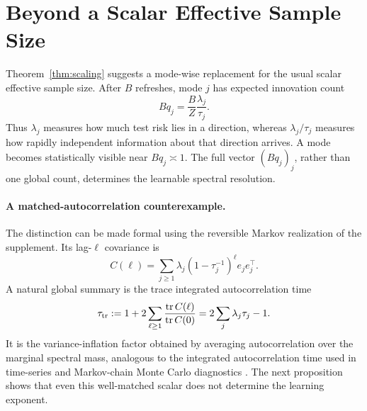 \section{Beyond a Scalar Effective Sample Size}
\label{sec:ess}

Theorem~\ref{thm:scaling} suggests a mode-wise replacement for the usual
scalar effective sample size.  After $B$ refreshes, mode $j$ has expected
innovation count
\begin{equation}
Bq_j
=\frac{B}{Z}\frac{\lambda_j}{\tau_j}.
\label{eq:mode-wise-information}
\end{equation}
Thus $\lambda_j$ measures how much test risk lies in a direction, whereas
$\lambda_j/\tau_j$ measures how rapidly independent information about that
direction arrives.  A mode becomes statistically visible near $Bq_j\asymp1$.
The full vector $(Bq_j)_j$, rather than one global count, determines the
learnable spectral resolution.

\paragraph{A matched-autocorrelation counterexample.}
The distinction can be made formal using the reversible Markov realization of
the supplement.  Its lag-$\ell$ covariance is
\begin{equation}
C(\ell)=\sum_{j\ge1}\lambda_j
(1-\tau_j^{-1})^\ell e_je_j^\top.
\label{eq:mode-covariance-main}
\end{equation}
A natural global summary is the trace integrated autocorrelation time
\begin{equation}
\tau_{\rm tr}
:=1+2\sum_{\ell\ge1}
\frac{\operatorname{tr}C(\ell)}{\operatorname{tr}C(0)}
=2\sum_j\lambda_j\tau_j-1.
\label{eq:trace-iat}
\end{equation}
It is the variance-inflation factor obtained by averaging autocorrelation over
the marginal spectral mass, analogous to the integrated autocorrelation time
used in time-series and Markov-chain Monte Carlo diagnostics
\cite{geyer1992practical}.  The next proposition shows that even this
well-matched scalar does not determine the learning exponent.

